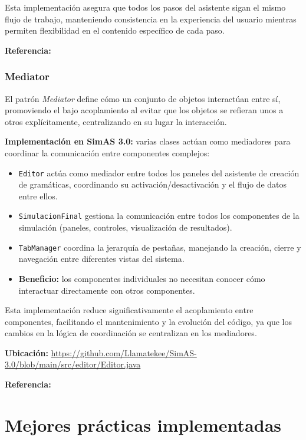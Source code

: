 Esta implementación asegura que todos los pasos del asistente sigan el mismo flujo de trabajo, manteniendo consistencia en la experiencia del usuario mientras permiten flexibilidad en el contenido específico de cada paso.

\textbf{Referencia:} \cite[pp. 325-330]{gamma1994design}

\subsubsection{Mediator}

El patrón \textit{Mediator} define cómo un conjunto de objetos interactúan entre sí, promoviendo el bajo acoplamiento al evitar que los objetos se refieran unos a otros explícitamente, centralizando en su lugar la interacción.

\textbf{Implementación en SimAS 3.0:} varias clases actúan como mediadores para coordinar la comunicación entre componentes complejos:

\begin{itemize}
    \item \texttt{Editor} actúa como mediador entre todos los paneles del asistente de creación de gramáticas, coordinando su activación/desactivación y el flujo de datos entre ellos.
    \item \texttt{SimulacionFinal} gestiona la comunicación entre todos los componentes de la simulación (paneles, controles, visualización de resultados).
    \item \texttt{TabManager} coordina la jerarquía de pestañas, manejando la creación, cierre y navegación entre diferentes vistas del sistema.
    \item \textbf{Beneficio:} los componentes individuales no necesitan conocer cómo interactuar directamente con otros componentes.
\end{itemize}

Esta implementación reduce significativamente el acoplamiento entre componentes, facilitando el mantenimiento y la evolución del código, ya que los cambios en la lógica de coordinación se centralizan en los mediadores.

\textbf{Ubicación:} \url{https://github.com/Llamatekee/SimAS-3.0/blob/main/src/editor/Editor.java}

\textbf{Referencia:} \cite[pp. 273-282]{gamma1994design}

\section{Mejores prácticas implementadas}

